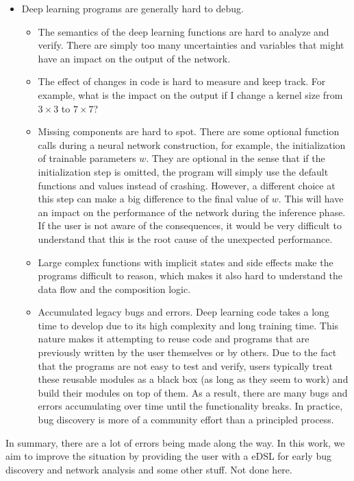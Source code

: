 \begin{itemize}
\begin{itemize}
\item Deep learning programs are generally hard to debug.
  \begin{itemize}
  \item The semantics of the deep learning functions are hard to analyze and verify. There are simply too many uncertainties and variables that might have an impact on the output of the network.
  \item The effect of changes in code is hard to measure and keep track. For example, what is the impact on the output if I change a kernel size from $3\times 3$ to $7\times 7$?
  \item Missing components are hard to spot. There are some optional function calls during a neural network construction, for example, the initialization of trainable parameters $w$.
    They are optional in the sense that if the initialization step is omitted, the program will simply use the default functions and values instead of crashing.
    However, a different choice at this step can make a big difference to the final value of $w$. This will have an impact on the performance of the network during the inference phase. If the user is not aware of the consequences, it would be very difficult to understand that this is the root cause of the unexpected performance.
\item Large complex functions with implicit states and side effects make the programs difficult to reason, which makes it also hard to understand the data flow and the composition logic.
    \item Accumulated legacy bugs and errors. Deep learning code takes a long time to develop due to its high complexity and long training time. This nature makes it attempting to reuse code and programs that are previously written by the user themselves or by others. Due to the fact that the programs are not easy to test and verify, users typically treat these reusable modules as a black box (as long as they seem to work) and build their modules on top of them. As a result, there are many bugs and errors accumulating over time until the functionality breaks. In practice, bug discovery is more of a community effort than a principled process.
  \end{itemize}
\end{itemize}
\end{itemize}
In summary, there are a lot of errors being made along the way. In this work, we aim to improve the situation by providing the user with a eDSL for early bug discovery and network analysis and some other stuff. Not done here.

